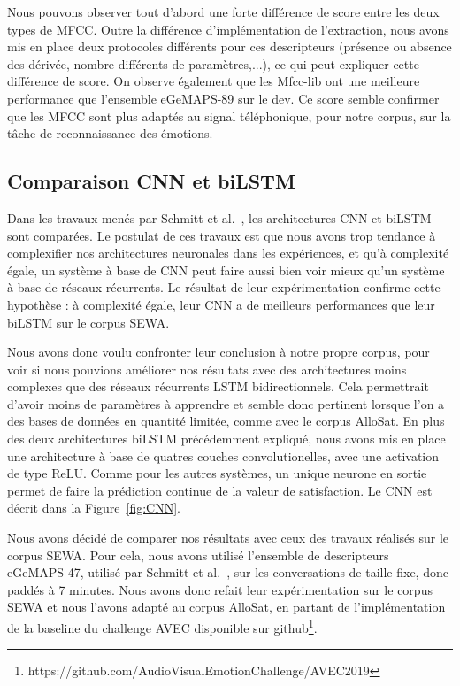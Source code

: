 

Nous pouvons observer tout d'abord une forte différence de score entre les deux types de MFCC. Outre la différence d'implémentation de l'extraction, nous avons mis en place deux protocoles différents pour ces descripteurs (présence ou absence des dérivée, nombre différents de paramètres,...), ce qui peut expliquer cette différence de score. On observe également que les Mfcc-lib ont une meilleure performance que l'ensemble eGeMAPS-89 sur le dev. Ce score semble confirmer que les MFCC sont plus adaptés au signal téléphonique, pour notre corpus, sur la tâche de reconnaissance des émotions.

\subsection{Comparaison CNN et biLSTM}
Dans les travaux menés par Schmitt et al.~\cite{Schmitt2019}, les architectures CNN et biLSTM sont comparées. Le postulat de ces travaux est que nous avons trop tendance à complexifier nos architectures neuronales dans les expériences, et qu'à complexité égale, un système à base de CNN peut faire aussi bien voir mieux qu'un système à base de réseaux récurrents. Le résultat de leur expérimentation confirme cette hypothèse : à complexité égale, leur CNN a de meilleurs performances que leur biLSTM sur le corpus SEWA.

Nous avons donc voulu confronter leur conclusion à notre propre corpus, pour voir si nous pouvions améliorer nos résultats avec des architectures moins complexes que des réseaux récurrents LSTM bidirectionnels. Cela permettrait d'avoir moins de paramètres à apprendre et semble donc pertinent lorsque l'on a des bases de données en quantité limitée, comme avec le corpus AlloSat. En plus des deux architectures biLSTM précédemment expliqué, nous avons mis en place une architecture à base de quatres couches convolutionelles, avec une activation de type ReLU. Comme pour les autres systèmes, un unique neurone en sortie permet de faire la prédiction continue de la valeur de satisfaction. Le CNN est décrit dans la Figure~\ref{fig:CNN}.



Nous avons décidé de comparer nos résultats avec ceux des travaux réalisés sur le corpus SEWA. Pour cela, nous avons utilisé l'ensemble de descripteurs eGeMAPS-47, utilisé par Schmitt et al.~\cite{Schmitt2019}, sur les conversations de taille fixe, donc paddés à 7 minutes. Nous avons donc refait leur expérimentation sur le corpus SEWA et nous l'avons adapté au corpus AlloSat, en partant de l'implémentation de la baseline du challenge AVEC disponible sur github\footnote{https://github.com/AudioVisualEmotionChallenge/AVEC2019}.

